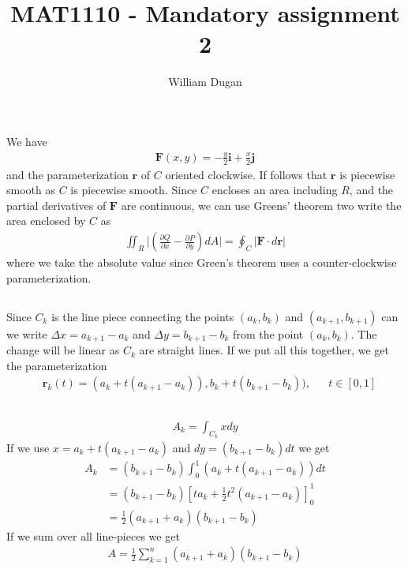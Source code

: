 \documentclass[a4paper,10pt,english]{article}
\title{MAT1110 - Mandatory assignment 2}
\author{William Dugan}
\begin{document}
\maketitle

\section{} \label{1}

\subsection{} \label{1a}

We have
\begin{align}
    \bm{F} (x, y) = - \frac{y}{2} \bm{i} + \frac{x}{2} \bm{j}
\end{align}
and the parameterization $\bm{r}$ of $C$ oriented clockwise. If follows that $\bm{r}$ is piecewise smooth as $C$ is piecewise smooth. Since $C$ encloses an area including $R$, and the partial derivatives of $\bm{F}$ are continuous, we can use Greens' theorem two write the area enclosed by $C$ as
\begin{align*}
    \iint_R \Big| \left( \frac{\partial Q}{\partial x} - \frac{\partial P}{\partial y} \right) dA \Big|
    = \oint_C | \bm{F} \cdot d\bm{r} |
\end{align*}
where we take the absolute value since Green's theorem uses a counter-clockwise parameterization.

\subsection{} \label{1b}
Since $C_k$ is the line piece connecting the points $(a_k, b_k)$ and $(a_{k+1}, b_{k+1})$ can we write \newline $\Delta x = a_{k+1} - a_k$ and $\Delta y = b_{k+1} - b_k$ from the point $(a_k, b_k)$. The change will be linear as $C_k$ are straight lines. If we put all this together, we get the parameterization
\begin{align}
    &\bm{r}_k (t) = 
    (a_k + t (a_{k+1} - a_k)), b_k + t (b_{k+1} - b_k)), 
    & &t \in [0, 1]
\end{align}

\subsection{} \label{1c}
\begin{align}
    A_k = \int_{C_k} x dy
\end{align}
If we use $x = a_k + t (a_{k+1} - a_k)$ and $dy = ( b_{k+1} - b_k) dt$ we get
\begin{align*}
    A_k &= (b_{k+1} - b_k) \int_0^1 (a_k + t (a_{k+1} - a_k)) dt \\
    &= (b_{k+1} - b_k) \left[ ta_k + \frac{1}{2} t^2 (a_{k+1} - a_k) \right]_0^1 \\
    &= \frac{1}{2} (a_{k+1} + a_k)(b_{k+1} - b_k)
\end{align*}
If we sum over all line-pieces we get
\begin{align} \label{eq:sum}
    A = \frac{1}{2} \sum_{k=1}^{n} (a_{k+1} + a_k)(b_{k+1} - b_k) 
\end{align}
\end{document}
